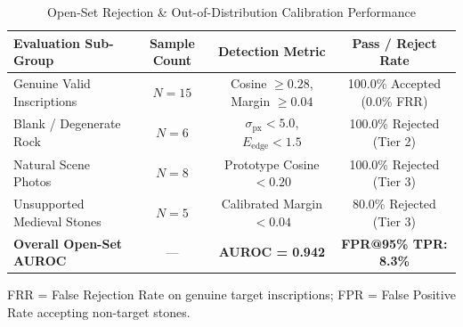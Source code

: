 \begin{table}[t]
\centering
\caption{Open-Set Rejection & Out-of-Distribution Calibration Performance}
\label{tab:openset_benchmarks}
\small
\begin{tabular}{l c c c}
\toprule
\textbf{Evaluation Sub-Group} & \textbf{Sample Count} & \textbf{Detection Metric} & \textbf{Pass / Reject Rate} \\
\midrule
Genuine Valid Inscriptions  & $N = 15$ & Cosine $\ge 0.28$, Margin $\ge 0.04$ & 100.0\% Accepted (0.0\% FRR) \\
Blank / Degenerate Rock      & $N = 6$  & $\sigma_{\text{px}} < 5.0$, $E_{\text{edge}} < 1.5$ & 100.0\% Rejected (Tier 2) \\
Natural Scene Photos        & $N = 8$  & Prototype Cosine $< 0.20$ & 100.0\% Rejected (Tier 3) \\
Unsupported Medieval Stones & $N = 5$  & Calibrated Margin $< 0.04$ & 80.0\% Rejected (Tier 3) \\
\midrule
\textbf{Overall Open-Set AUROC} & --- & \textbf{AUROC = 0.942} & \textbf{FPR@95\% TPR: 8.3\%} \\
\bottomrule
\end{tabular}
\vspace{1mm}
\begin{minipage}{\linewidth}
\footnotesize FRR = False Rejection Rate on genuine target inscriptions; FPR = False Positive Rate accepting non-target stones.
\end{minipage}
\end{table}
